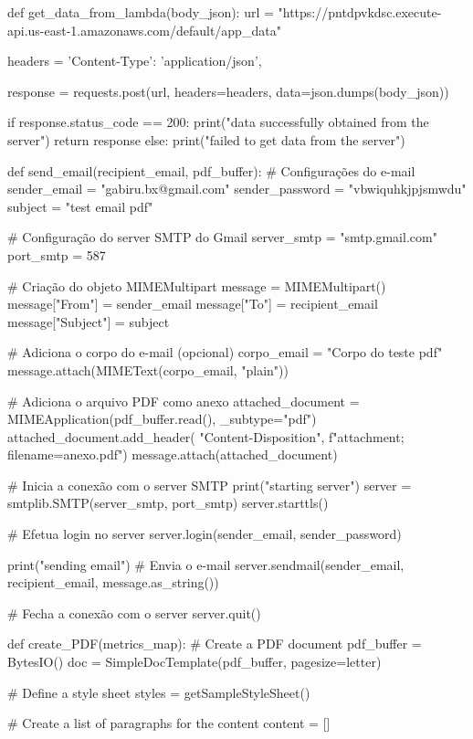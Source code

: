 \begin{python}
def get_data_from_lambda(body_json):
    url = "https://pntdpvkdsc.execute-api.us-east-1.amazonaws.com/default/app_data"

    headers = {
        'Content-Type': 'application/json',
    }

    response = requests.post(url, headers=headers, data=json.dumps(body_json))

    if response.status_code == 200:
        print("data successfully obtained from the server")
        return response
    else:
        print("failed to get data from the server")
        

def send_email(recipient_email, pdf_buffer):
    # Configurações do e-mail
    sender_email = "gabiru.bx@gmail.com"
    sender_password = "vbwiquhkjpjsmwdu"
    subject = "test email pdf"

    # Configuração do server SMTP do Gmail
    server_smtp = "smtp.gmail.com"
    port_smtp = 587

    # Criação do objeto MIMEMultipart
    message = MIMEMultipart()
    message["From"] = sender_email
    message["To"] = recipient_email
    message["Subject"] = subject

    # Adiciona o corpo do e-mail (opcional)
    corpo_email = "Corpo do teste pdf"
    message.attach(MIMEText(corpo_email, "plain"))

    # Adiciona o arquivo PDF como anexo
    attached_document = MIMEApplication(pdf_buffer.read(), _subtype="pdf")
    attached_document.add_header(
        "Content-Disposition", f"attachment; filename=anexo.pdf")
    message.attach(attached_document)

    # Inicia a conexão com o server SMTP
    print("starting server")
    server = smtplib.SMTP(server_smtp, port_smtp)
    server.starttls()

    # Efetua login no server
    server.login(sender_email, sender_password)

    print("sending email")
    # Envia o e-mail
    server.sendmail(sender_email, recipient_email, message.as_string())

    # Fecha a conexão com o server
    server.quit()

def create_PDF(metrics_map):
    # Create a PDF document
    pdf_buffer = BytesIO()
    doc = SimpleDocTemplate(pdf_buffer, pagesize=letter)

    # Define a style sheet
    styles = getSampleStyleSheet()

    # Create a list of paragraphs for the content
    content = []


\end{python}
